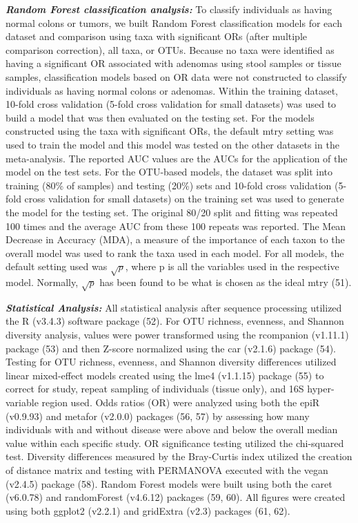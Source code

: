 \documentclass[12pt,]{article}
\begin{document}
\textbf{\emph{Random Forest classification analysis:}} To classify
individuals as having normal colons or tumors, we built Random Forest
classification models for each dataset and comparison using taxa with
significant ORs (after multiple comparison correction), all taxa, or
OTUs. Because no taxa were identified as having a significant OR
associated with adenomas using stool samples or tissue samples,
classification models based on OR data were not constructed to classify
individuals as having normal colons or adenomas. Within the training
dataset, 10-fold cross validation (5-fold cross validation for small
datasets) was used to build a model that was then evaluated on the
testing set. For the models constructed using the taxa with significant
ORs, the default mtry setting was used to train the model and this model
was tested on the other datasets in the meta-analysis. The reported AUC
values are the AUCs for the application of the model on the test sets.
For the OTU-based models, the dataset was split into training (80\% of
samples) and testing (20\%) sets and 10-fold cross validation (5-fold
cross validation for small datasets) on the training set was used to
generate the model for the testing set. The original 80/20 split and
fitting was repeated 100 times and the average AUC from these 100
repeats was reported. The Mean Decrease in Accuracy (MDA), a measure of
the importance of each taxon to the overall model was used to rank the
taxa used in each model. For all models, the default setting used was
\(\sqrt{p}\), where p is all the variables used in the respective model.
Normally, \(\sqrt{p}\) has been found to be what is chosen as the ideal
mtry (51).

\textbf{\emph{Statistical Analysis:}} All statistical analysis after
sequence processing utilized the R (v3.4.3) software package (52). For
OTU richness, evenness, and Shannon diversity analysis, values were
power transformed using the rcompanion (v1.11.1) package (53) and then
Z-score normalized using the car (v2.1.6) package (54). Testing for OTU
richness, evenness, and Shannon diversity differences utilized linear
mixed-effect models created using the lme4 (v1.1.15) package (55) to
correct for study, repeat sampling of individuals (tissue only), and 16S
hyper-variable region used. Odds ratios (OR) were analyzed using both
the epiR (v0.9.93) and metafor (v2.0.0) packages (56, 57) by assessing
how many individuals with and without disease were above and below the
overall median value within each specific study. OR significance testing
utilized the chi-squared test. Diversity differences measured by the
Bray-Curtis index utilized the creation of distance matrix and testing
with PERMANOVA executed with the vegan (v2.4.5) package (58). Random
Forest models were built using both the caret (v6.0.78) and randomForest
(v4.6.12) packages (59, 60). All figures were created using both ggplot2
(v2.2.1) and gridExtra (v2.3) packages (61, 62).
\end{document}

